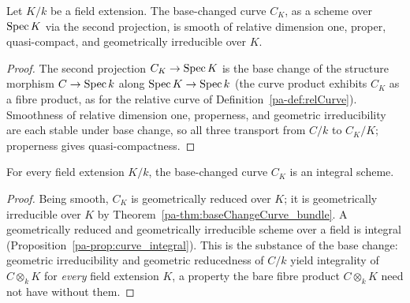 \begin{theorem}
  \label{pa-thm:baseChangeCurve_bundle}
  \leanok

  Let \(K/k\) be a field extension. The base-changed curve \(C_K\), as a scheme over \(\operatorname{Spec} K\)
  via the second projection, is smooth of relative dimension one, proper, quasi-compact, and
  geometrically irreducible over \(K\).
\end{theorem}
\begin{proof}
  \leanok
  The second projection \(C_K \to \operatorname{Spec} K\) is the base change of the structure morphism \(C \to
  \operatorname{Spec} k\) along \(\operatorname{Spec} K \to \operatorname{Spec} k\) (the curve product exhibits \(C_K\) as a fibre product,
  as for the relative curve of Definition~\ref{pa-def:relCurve}). Smoothness of relative dimension
  one, properness, and geometric irreducibility are each stable under base change, so all three
  transport from \(C/k\) to \(C_K/K\); properness gives quasi-compactness.
\end{proof}

\begin{theorem}
  \label{pa-thm:baseChangeCurve_integral}
  \leanok

  For every field extension \(K/k\), the base-changed curve \(C_K\) is an integral scheme.
\end{theorem}
\begin{proof}
  \leanok
  Being smooth, \(C_K\) is geometrically reduced over \(K\); it is geometrically irreducible over
  \(K\) by Theorem~\ref{pa-thm:baseChangeCurve_bundle}. A geometrically reduced and geometrically
  irreducible scheme over a field is integral (Proposition~\ref{pa-prop:curve_integral}). This is
  the substance of the base change: geometric irreducibility and geometric reducedness of \(C/k\)
  yield integrality of \(C \otimes_k K\) for \emph{every} field extension \(K\), a property the
  bare fibre product \(C \otimes_k K\) need not have without them.
\end{proof}

